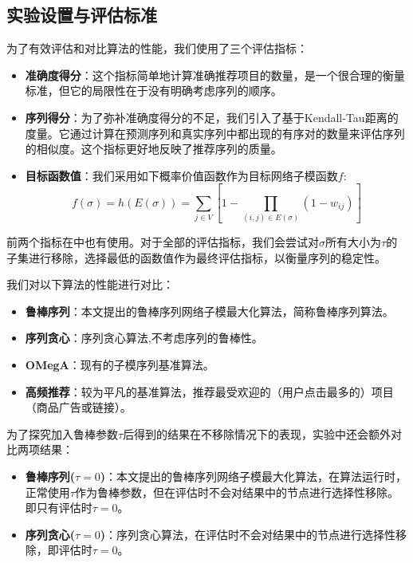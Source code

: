 \subsection{实验设置与评估标准}

为了有效评估和对比算法的性能，我们使用了三个评估指标：

\begin{itemize}
    \item \textbf{准确度得分}：这个指标简单地计算准确推荐项目的数量，是一个很合理的衡量标准，但它的局限性在于没有明确考虑序列的顺序。
    \item \textbf{序列得分}：为了弥补准确度得分的不足，我们引入了基于Kendall-Tau距离\cite{kendall1938new}的度量。它通过计算在预测序列和真实序列中都出现的有序对的数量来评估序列的相似度。这个指标更好地反映了推荐序列的质量。
    \item \textbf{目标函数值}：我们采用如下概率价值函数作为目标网络子模函数$f$:
\begin{equation}
    f(\sigma)=h(E(\sigma))=\sum_{j\in V} [1- \prod_{(i,j)\in E(\sigma)} (1-w_{ij})]
\end{equation}
\end{itemize}

前两个指标在\parencite{mitrovic2019adaptive}中也有使用。对于全部的评估指标，我们会尝试对$\sigma$所有大小为$\tau$的子集进行移除，选择最低的函数值作为最终评估指标，以衡量序列的稳定性。

我们对以下算法的性能进行对比：

\begin{itemize}
\item {\bfseries 鲁棒序列}：本文提出的鲁棒序列网络子模最大化算法，简称鲁棒序列算法。
\item {\bfseries 序列贪心}：序列贪心算法\cite{mitrovic2018submodularity},不考虑序列的鲁棒性。
\item {\bfseries OMegA}：现有的子模序列基准算法\cite{tschiatschek2017selecting}。
\item {\bfseries 高频推荐}：较为平凡的基准算法，推荐最受欢迎的（用户点击最多的）项目（商品广告或链接）。
\end{itemize}

为了探究加入鲁棒参数$\tau$后得到的结果在不移除情况下的表现，实验中还会额外对比两项结果：
\begin{itemize}
\item {\bfseries 鲁棒序列($\tau = 0$)}：本文提出的鲁棒序列网络子模最大化算法，在算法运行时，正常使用$\tau$作为鲁棒参数，但在评估时不会对结果中的节点进行选择性移除。即只有评估时$\tau = 0$。
\item {\bfseries 序列贪心($\tau = 0$)}：序列贪心算法，在评估时不会对结果中的节点进行选择性移除，即评估时$\tau = 0$。
\end{itemize}



